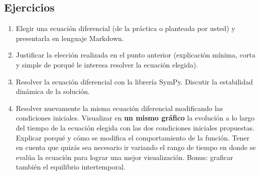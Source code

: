 \documentclass[a4paper,11pt]{article}
\begin{document}
\subsection*{Ejercicios}
	\begin{enumerate}
		\item Elegir una ecuación diferencial (de la práctica o planteada por usted) y presentarla en lenguaje Markdown.
		\item Justificar la elección realizada en el punto anterior (explicación mínima, corta y simple de porqué le interesa resolver la ecuación elegida).
		\item Resolver la ecuación diferencial con la librería SymPy. Discutir la estabilidad dinámica de la solución. 
		\item Resolver nuevamente la misma ecuación diferencial modificando las condiciones iniciales. Visualizar en \textbf{un mismo gráfico} la evolución a lo largo del tiempo de la ecuación elegida con las dos condiciones iniciales propuestas. Explicar porqué y cómo se modifica el comportamiento de la función. Tener en cuenta que quizás sea necesario ir variando el rango de tiempo en donde se evalúa la ecuación para lograr una mejor visualización. Bonus: graficar también el equilibrio intertemporal.
		

\end{enumerate}
\end{document}
